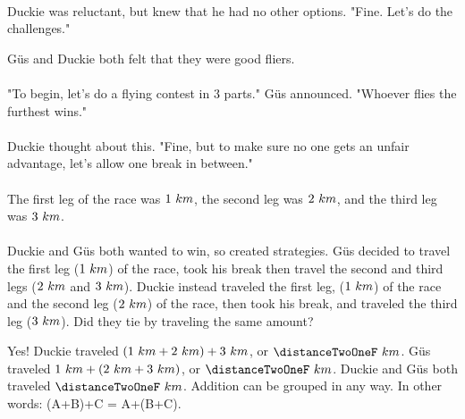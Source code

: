 \paragraph{} Duckie was reluctant, but knew that he had no other options. "Fine. Let's do the challenges."
\vfill
\pagebreak
{}
{G{\"u}s and Duckie both felt that they were good fliers. 
\paragraph{} "To begin, let's do a flying contest in 3 parts." G{\"u}s announced. "Whoever flies the furthest wins."
\paragraph{} Duckie thought about this. "Fine, but to make sure no one gets an unfair advantage, let's allow one break in between."
\paragraph{} The first leg of the race was $1~km$, the second leg was $2~km$, and the third leg was $3~km$. 
\paragraph{} Duckie and G{\"u}s both wanted to win, so created strategies. G{\"u}s decided to travel the first leg ($1~km$) of the race, took his break then travel the second and third legs ($2~km$ and $3~km$). Duckie instead traveled the first leg, ($1~km$) of the race and the second leg ($2~km$) of the race, then took his break, and traveled the third leg ($3~km$). Did they tie by traveling the same amount?}
{Yes! Duckie traveled $(1~km + 2~km) + 3~km$, or $\distanceTwoOneF~km$. G{\"u}s traveled $1~km + (2~km + 3~km)$, or $\distanceTwoOneF~km$. Duckie and G{\"u}s both traveled $\distanceTwoOneF~km$.}
{Addition can be grouped in any way. In other words: (A+B)+C = A+(B+C).}
{}
